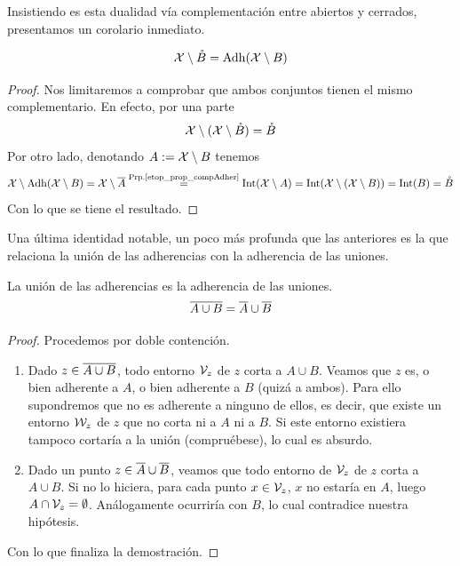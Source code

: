 Insistiendo es esta dualidad vía complementación entre abiertos y cerrados, presentamos un corolario inmediato.
\begin{cor}
	\label{etop_cor_compInter}
	\begin{equation*}
	\mathcal{X}\setminus\mathring{B}=\operatorname{\mathrm{Adh}}(\mathcal{X} \setminus B)
	\end{equation*}
\end{cor}
\begin{proof}
	Nos limitaremos a comprobar que ambos conjuntos tienen el mismo complementario. En efecto, por una parte
	\begin{equation*}
	\mathcal{X} \setminus (\mathcal{X} \setminus \mathring{B}) = \mathring{B}
	\end{equation*}
	Por otro lado, denotando $A:=\mathcal{X} \setminus B$ tenemos
	\begin{equation*}
	\mathcal{X} \setminus \operatorname{\mathrm{Adh}}(\mathcal{X} \setminus B)=\mathcal{X} \setminus \overline{A}\stackrel{\textrm{Prp.\ref{etop_prop_compAdher}}}{=}\operatorname{\mathrm{Int}}(\mathcal{X} \setminus A)=\operatorname{\mathrm{Int}}(\mathcal{X} \setminus (\mathcal{X} \setminus B))=\operatorname{\mathrm{Int}}(B)=\mathring{B}
	\end{equation*}
	Con lo que se tiene el resultado.
\end{proof}
Una última identidad notable, un poco más profunda que las anteriores es la que relaciona la unión de las adherencias con la adherencia de las uniones.
\begin{prop}
	La unión de las adherencias es la adherencia de las uniones.
	\label{etop_prop_unionAdher}
	\begin{equation*}
	\overline{A\cup B}=\overline{A}\cup\overline{B}
	\end{equation*}
\end{prop}
\begin{proof}
	Procedemos por doble contención.
	\begin{enumerate}
		\item[\bsubset] 
		Dado $z\in \overline{A\cup B}$, todo entorno $\mathcal{V}_z$ de $z$ corta a $A\cup B$. Veamos que $z$ es, o bien adherente a $A$, o bien adherente a $B$ (quizá a ambos). Para ello supondremos que no es adherente a ninguno de ellos, es decir, que existe un entorno $\mathcal{W}_z$ de $z$ que no corta ni a $A$ ni a $B$. Si este entorno existiera tampoco cortaría a la unión (compruébese), lo cual es absurdo.
		\item[\bsupset]
		Dado un punto $z\in\overline{A}\cup\overline{B}$, veamos que todo entorno de $\mathcal{V}_z$ de $z$ corta a $A\cup B$. Si no lo hiciera, para cada punto $x\in\mathcal{V}_z$, $x$ no estaría en $A$, luego $A\cap \mathcal{V}_z=\emptyset$. Análogamente ocurriría con $B$, lo cual contradice nuestra hipótesis.
	\end{enumerate}
	Con lo que finaliza la demostración.
\end{proof}
